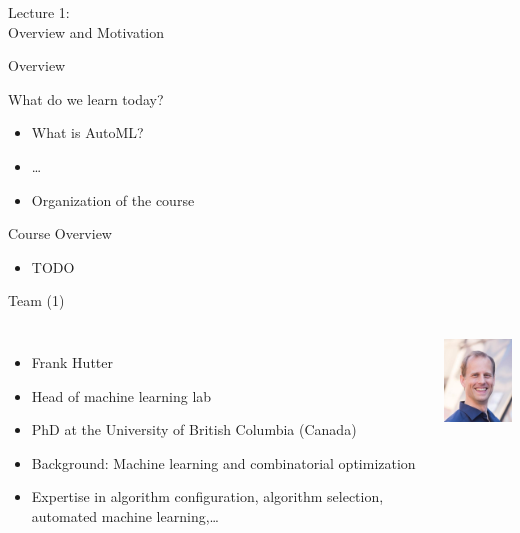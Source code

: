 \begin{frame}[c]{}

\centering
\huge
Lecture 1:\\
Overview and Motivation
\end{frame}
\begin{frame}[c]{Overview}

What do we learn today?

\begin{itemize}
  \item What is AutoML?
  \item \ldots
  \item Organization of the course
\end{itemize}

\end{frame}
\begin{frame}[c]{Course Overview}

\begin{itemize}
	\item TODO
\end{itemize}


\end{frame}
\begin{frame}[c]{Team (1)}

\begin{columns}[T]
\begin{itemize}
  \item Frank Hutter
  \item Head of machine learning lab
  \item PhD at the University of British Columbia (Canada)
  \item Background: Machine learning and combinatorial optimization
  \item Expertise in algorithm configuration, algorithm selection, automated machine learning,\ldots
\end{itemize}
\vspace*{0.7cm}
\includegraphics[width=6.7em]{images/team/frank_small}

\end{columns}

\end{frame}
